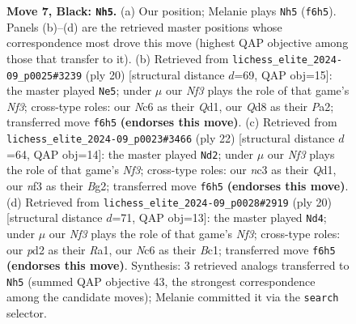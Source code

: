 \documentclass[11pt]{article}
\begin{document}
\begin{figure}[p]
\caption{\textbf{Move 7, Black: \texttt{Nh5}.} (a) Our position; Melanie plays \texttt{Nh5} (\texttt{f6h5}). Panels (b)--(d) are the retrieved master positions whose correspondence most drove this move (highest QAP objective among those that transfer to it). (b) Retrieved from \texttt{lichess\_elite\_2024-09\_p0025\#3239} (ply 20) [structural distance $d$=69, QAP obj=15]: the master played \texttt{Ne5}; under $\mu$ our \emph{Nf3} plays the role of that game's \emph{Nf3}; cross-type roles: our \emph{N}c6 as their \emph{Q}d1, our \emph{Q}d8 as their \emph{P}a2; transferred move \texttt{f6h5} \textbf{(endorses this move)}. (c) Retrieved from \texttt{lichess\_elite\_2024-09\_p0023\#3466} (ply 22) [structural distance $d$=64, QAP obj=14]: the master played \texttt{Nd2}; under $\mu$ our \emph{Nf3} plays the role of that game's \emph{Nf3}; cross-type roles: our \emph{n}c3 as their \emph{Q}d1, our \emph{n}f3 as their \emph{B}g2; transferred move \texttt{f6h5} \textbf{(endorses this move)}. (d) Retrieved from \texttt{lichess\_elite\_2024-09\_p0028\#2919} (ply 20) [structural distance $d$=71, QAP obj=13]: the master played \texttt{Nd4}; under $\mu$ our \emph{Nf3} plays the role of that game's \emph{Nf3}; cross-type roles: our \emph{p}d2 as their \emph{R}a1, our \emph{N}c6 as their \emph{B}c1; transferred move \texttt{f6h5} \textbf{(endorses this move)}. Synthesis: 3 retrieved analogs transferred to \texttt{Nh5} (summed QAP objective 43, the strongest correspondence among the candidate moves); Melanie committed it via the \texttt{search} selector.}
\label{fig:thought-m13}
\end{figure}

\clearpage
\end{document}
